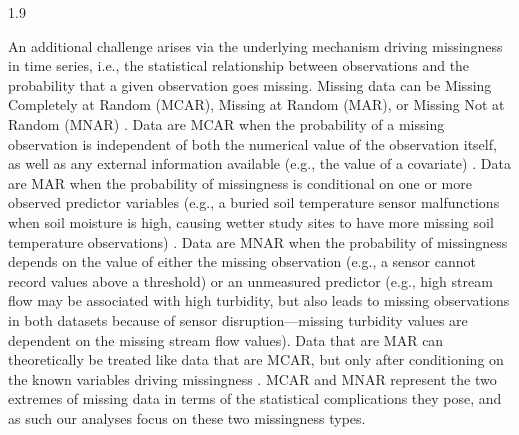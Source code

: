 \documentclass[12pt,english]{article} %
\begin{document}
\begin{linenumbers}
\begin{spacing}{1.9}
\begin{flushleft}
\hspace{1em} An additional challenge arises via the underlying mechanism driving missingness in time series, i.e., the statistical relationship between observations and the probability that a given observation goes missing. Missing data can be Missing Completely at Random (MCAR), Missing at Random (MAR), or Missing Not at Random (MNAR) \citep[][Appendix S1: Fig. S1]{rubin_inference_1976, nakagawa_missing_2015}. Data are MCAR when the probability of a missing observation is independent of both the numerical value of the observation itself, as well as any external information available (e.g., the value of a covariate) \citep{nakagawa_missing_2015, horton2007much, newman_missing_2014}.
Data are MAR when the probability of missingness is conditional on one or more observed predictor variables (e.g., a buried soil temperature sensor malfunctions when soil moisture is high, causing wetter study sites to have more missing soil temperature observations) \citep{newman_missing_2014, ellington_using_2015, nakagawa_missing_2015}. Data are MNAR when the probability of missingness depends on the value of either the missing observation (e.g., a sensor cannot record values above a threshold) or an unmeasured predictor (e.g., high stream flow may be associated with high turbidity, but also leads to missing observations in both datasets because of sensor disruption---missing turbidity values are dependent on the missing stream flow values). Data that are MAR can theoretically be treated like data that are MCAR, but only after conditioning on the known variables driving missingness \citep{nakagawa_missing_2015, nakagawa_model_2011}.
MCAR and MNAR represent the two extremes of missing data in terms of the statistical complications they pose, and as such our analyses focus on these two missingness types.



\end{flushleft}
\end{spacing}
\end{linenumbers}
\end{document}
